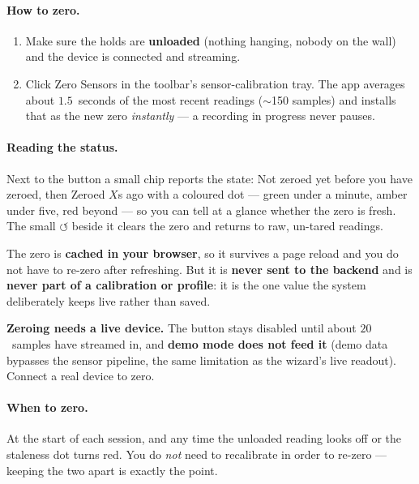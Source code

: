 \documentclass[11pt,a4paper]{article}
\begin{document}
\paragraph{How to zero.}
\begin{enumerate}[leftmargin=1.6em]
  \item Make sure the holds are \textbf{unloaded} (nothing hanging, nobody on the
        wall) and the device is connected and streaming.
  \item Click \textsf{Zero Sensors} in the toolbar's sensor-calibration tray. The
        app averages about $1.5$~seconds of the most recent readings ($\sim$150
        samples) and installs that as the new zero \emph{instantly} --- a recording
        in progress never pauses.
\end{enumerate}

\paragraph{Reading the status.} Next to the button a small chip reports the state:
\textsf{Not zeroed yet} before you have zeroed, then \textsf{Zeroed $X$s ago} with a
coloured dot --- \textcolor{green!55!black}{green} under a minute,
\textcolor{warn}{amber} under five, red beyond --- so you can tell at a glance
whether the zero is fresh. The small $\circlearrowleft$ beside it clears the zero
and returns to raw, un-tared readings.

\begin{infobox}
The zero is \textbf{cached in your browser}, so it survives a page reload and you do
not have to re-zero after refreshing. But it is \textbf{never sent to the backend}
and is \textbf{never part of a calibration or profile}: it is the one value the
system deliberately keeps live rather than saved.
\end{infobox}

\begin{warnbox}
\textbf{Zeroing needs a live device.} The button stays disabled until about
$20$~samples have streamed in, and \textbf{demo mode does not feed it} (demo data
bypasses the sensor pipeline, the same limitation as the wizard's live readout).
Connect a real device to zero.
\end{warnbox}

\paragraph{When to zero.} At the start of each session, and any time the unloaded
reading looks off or the staleness dot turns red. You do \emph{not} need to
recalibrate in order to re-zero --- keeping the two apart is exactly the point.
\end{document}
